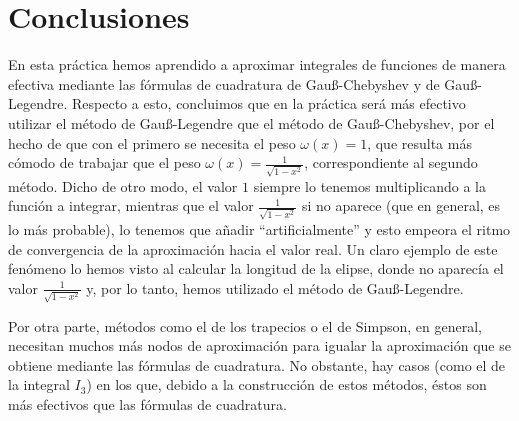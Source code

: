 \documentclass[a4paper]{article}
\begin{document}
\section*{Conclusiones} 
En esta práctica hemos aprendido a aproximar integrales de funciones de manera efectiva mediante las fórmulas de cuadratura de Gau\ss-Chebyshev y de Gau\ss-Legendre. Respecto a esto, concluimos que en la práctica será más efectivo utilizar el método de Gau\ss-Legendre que el método de Gau\ss-Chebyshev, por el hecho de que con el primero se necesita el peso $\omega(x)=1$, que resulta más cómodo de trabajar que el peso $\omega(x)=\frac{1}{\sqrt{1-x^2}}$, correspondiente al segundo método. Dicho de otro modo, el valor $1$ siempre lo tenemos multiplicando a la función a integrar, mientras que el valor $\frac{1}{\sqrt{1-x^2}}$ si no aparece (que en general, es lo más probable), lo tenemos que añadir ``artificialmente'' y esto empeora el ritmo de convergencia de la aproximación hacia el valor real. Un claro ejemplo de este fenómeno lo hemos visto al calcular la longitud de la elipse, donde no aparecía el valor $\frac{1}{\sqrt{1-x^2}}$ y, por lo tanto, hemos utilizado el método de Gau\ss-Legendre.\par 
Por otra parte, métodos como el de los trapecios o el de Simpson, en general, necesitan muchos más nodos de aproximación para igualar la aproximación que se obtiene mediante las fórmulas de cuadratura. No obstante, hay casos (como el de la integral $I_3$) en los que, debido a la construcción de estos métodos, éstos son más efectivos que las fórmulas de cuadratura. 
\end{document}
